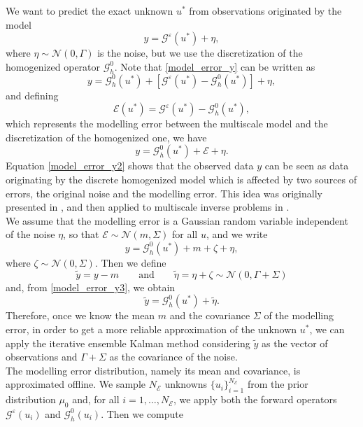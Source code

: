 \documentclass[10pt]{article}
\begin{document}
We want to predict the exact unknown $u^*$ from observations originated by the model
\begin{equation}
\label{model_error_y}
y = \mathcal{G}^{\varepsilon}(u^*) + \eta,
\end{equation}
where $\eta \sim \mathcal{N}(0,\Gamma)$ is the noise, but we use the discretization of the homogenized operator $\mathcal{G}^0_h$. Note that \eqref{model_error_y} can be written as
\[ y = \mathcal{G}^0_h(u^*) + \left [ \mathcal{G}^{\varepsilon}(u^*) - \mathcal{G}^0_h(u^*) \right ] + \eta, \]
and defining 
\[ \mathcal{E}(u^*) = \mathcal{G}^{\varepsilon}(u^*) - \mathcal{G}^0_h(u^*), \]
which represents the modelling error between the multiscale model and the discretization of the homogenized one, we have
\begin{equation}
\label{model_error_y2}
y = \mathcal{G}^0_h(u^*) + \mathcal{E} + \eta.
\end{equation}
Equation \eqref{model_error_y2} shows that the observed data $y$ can be seen as data originating by the discrete homogenized model which is affected by two sources of errors, the original noise and the modelling error. This idea was originally presented in \cite{KaS05}, and then applied to multiscale inverse problems in \cite{AbD18}. \\
We assume that the modelling error is a Gaussian random variable independent of the noise $\eta$, so that $\mathcal{E} \sim \mathcal{N}(m, \Sigma)$ for all $u$, and we write 
\begin{equation}
\label{model_error_y3}
y = \mathcal{G}^0_h(u^*) + m + \zeta + \eta,
\end{equation}
where $\zeta \sim \mathcal{N}(0, \Sigma)$. Then we define
\[ \tilde{y} = y - m \qquad \text{and} \qquad \tilde{\eta} = \eta + \zeta \sim \mathcal{N}(0, \Gamma + \Sigma) \]
and, from \eqref{model_error_y3}, we obtain
\begin{equation}
\label{model_error_y4}
\tilde{y} = \mathcal{G}^0_h(u^*) + \tilde{\eta}.
\end{equation}
Therefore, once we know the mean $m$ and the covariance $\Sigma$ of the modelling error, in order to get a more reliable approximation of the unknown $u^*$, we can apply the iterative ensemble Kalman method considering $\tilde{y}$ as the vector of observations and $\Gamma + \Sigma$ as the covariance of the noise. \\
The modelling error distribution, namely its mean and covariance, is approximated offline. We sample $N_{\mathcal{E}}$ unknowns $\{ u_i \}_{i=1}^{N_\mathcal{E}}$ from the prior distribution $\mu_0$ and, for all $i = 1, \dots, N_{\mathcal{E}}$, we apply both the forward operators $\mathcal{G}^{\varepsilon}(u_i)$ and $\mathcal{G}^0_h(u_i)$. Then we compute
\end{document}
